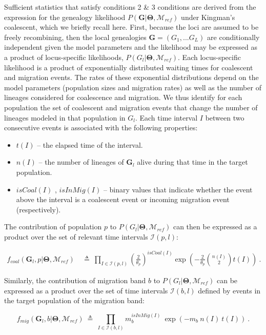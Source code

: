 \documentclass[11pt]{article}
\newcommand{\vect}[1]{\boldsymbol{\mathbf{#1}}}
\newcommand{\M}{\mathcal{M}}
\newcommand{\G}{\vect{G}}
\newcommand{\T}{\vect{\Theta}}
\newcommand{\Ip}{\mathcal{I}(p,l)}
\newcommand{\Ib}{\mathcal{I}(b,l)}
\newcommand{\Mref}{\M_{ref}}
\newcommand{\1}{\mathbbm{1}}
\begin{document}
Sufficient statistics that satisfy conditions 2 \& 3 conditions are derived from the expression for the genealogy likelihood $P(\G|\T, \Mref)$ under Kingman's coalescent, which we briefly recall here.
First, because the loci are assumed to be freely recombining, then the local genealogies $\G=(G_1,...G_L)$ are conditionally independent given the model parameters and the likelihood may be expressed as a product of locus-specific likelihoods, $P(G_l|\T,\Mref)$.  Each locus-specific likelihood is a product of exponentially distributed waiting times for coalescent and migration events. The rates of these exponential distributions depend on the model parameters (population sizes and migration rates) as well as the number of lineages considered for coalescence and migration. We thus identify for each population the set of coalescent and migration events that change the number of lineages modeled in that population in $G_l$. Each time interval $I$ between two consecutive events is associated with the following properties:
\begin{itemize}
 \item $t(I)$ -- the elapsed time of the interval.
 \item $n(I)$ -- the number of lineages of $\G_l$ alive during that time in the target population.
 \item $isCoal(I)$ , $isInMig(I)$  -- binary values that indicate whether the event above the interval is a coalescent event or incoming migration event (respectively).
\end{itemize}
%
%
The contribution of population $p$ to $P(G_l|\T,\Mref)$ can then be expressed as a product over the set of relevant time intervals $\Ip$:
%
%
\begin{small}
\begin{align}
f_{coal}(\G_l,p|\T,\Mref) 
& ~\triangleq~ \prod_{I \in \Ip} \left(\frac{2}{\theta_p}\right)^{isCoal(I)} \exp\left(-\frac{2}{\theta_p}{n(I) \choose 2}t(I)\right) ~. %
\label{eqn:ld-coal}
\end{align}
\end{small}
%
%
Similarly, the contribution of migration band $b$ to $P(G_l|\T,\Mref)$ can be expressed as a product over the set of time intervals $\Ib$ defined by events in the target population of the migration band:
%
%
\begin{small}
\begin{equation}
f_{mig}(\G_l,b|\T,\Mref) ~\triangleq~ \prod_{I \in \Ib} m_{b}^{isInMig(I)} ~ \exp \left( - m_b~ n(I)~t(I)\right) ~.
\label{eqn:ld-mig}
\end{equation}
\end{small}
%
%
\end{document}
